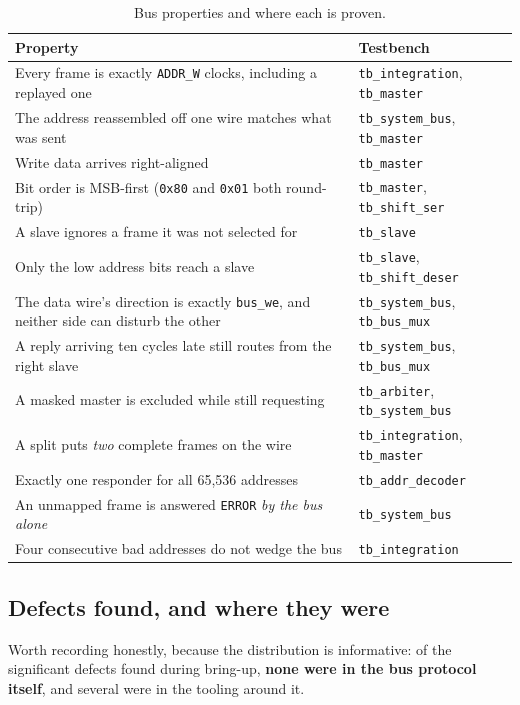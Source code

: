 \documentclass[11pt,a4paper]{article}
\newcommand{\sig}[1]{\texttt{#1}}
\begin{document}
\begin{table}[htb]
\centering\small
\caption{Bus properties and where each is proven.}
\begin{tabularx}{\textwidth}{@{}Xl@{}}
\toprule
\textbf{Property} & \textbf{Testbench}\\
\midrule
Every frame is exactly \sig{ADDR\_W} clocks, including a replayed one &
\sig{tb\_integration}, \sig{tb\_master}\\
The address reassembled off one wire matches what was sent &
\sig{tb\_system\_bus}, \sig{tb\_master}\\
Write data arrives right-aligned & \sig{tb\_master}\\
Bit order is MSB-first (\sig{0x80} and \sig{0x01} both round-trip) &
\sig{tb\_master}, \sig{tb\_shift\_ser}\\
A slave ignores a frame it was not selected for & \sig{tb\_slave}\\
Only the low address bits reach a slave &
\sig{tb\_slave}, \sig{tb\_shift\_deser}\\
The data wire's direction is exactly \sig{bus\_we}, and neither side can
disturb the other & \sig{tb\_system\_bus}, \sig{tb\_bus\_mux}\\
A reply arriving ten cycles late still routes from the right slave &
\sig{tb\_system\_bus}, \sig{tb\_bus\_mux}\\
A masked master is excluded while still requesting &
\sig{tb\_arbiter}, \sig{tb\_system\_bus}\\
A split puts \emph{two} complete frames on the wire &
\sig{tb\_integration}, \sig{tb\_master}\\
Exactly one responder for all 65{,}536 addresses & \sig{tb\_addr\_decoder}\\
An unmapped frame is answered \sig{ERROR} \emph{by the bus alone} &
\sig{tb\_system\_bus}\\
Four consecutive bad addresses do not wedge the bus & \sig{tb\_integration}\\
\bottomrule
\end{tabularx}
\end{table}

\subsection{Defects found, and where they were}

Worth recording honestly, because the distribution is informative: of the
significant defects found during bring-up, \textbf{none were in the bus
protocol itself}, and several were in the tooling around it.
\end{document}
